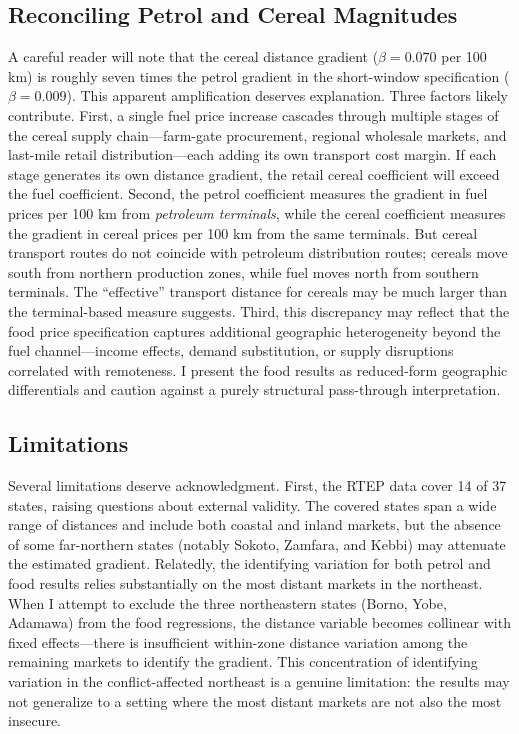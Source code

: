 \documentclass[12pt]{article}
\begin{document}
\subsection{Reconciling Petrol and Cereal Magnitudes}

A careful reader will note that the cereal distance gradient ($\beta = 0.070$ per 100 km) is roughly seven times the petrol gradient in the short-window specification ($\beta = 0.009$). This apparent amplification deserves explanation. Three factors likely contribute. First, a single fuel price increase cascades through multiple stages of the cereal supply chain---farm-gate procurement, regional wholesale markets, and last-mile retail distribution---each adding its own transport cost margin. If each stage generates its own distance gradient, the retail cereal coefficient will exceed the fuel coefficient. Second, the petrol coefficient measures the gradient in fuel prices per 100 km from \textit{petroleum terminals}, while the cereal coefficient measures the gradient in cereal prices per 100 km from the same terminals. But cereal transport routes do not coincide with petroleum distribution routes; cereals move south from northern production zones, while fuel moves north from southern terminals. The ``effective'' transport distance for cereals may be much larger than the terminal-based measure suggests. Third, this discrepancy may reflect that the food price specification captures additional geographic heterogeneity beyond the fuel channel---income effects, demand substitution, or supply disruptions correlated with remoteness. I present the food results as reduced-form geographic differentials and caution against a purely structural pass-through interpretation.

\subsection{Limitations}

Several limitations deserve acknowledgment. First, the RTEP data cover 14 of 37 states, raising questions about external validity. The covered states span a wide range of distances and include both coastal and inland markets, but the absence of some far-northern states (notably Sokoto, Zamfara, and Kebbi) may attenuate the estimated gradient. Relatedly, the identifying variation for both petrol and food results relies substantially on the most distant markets in the northeast. When I attempt to exclude the three northeastern states (Borno, Yobe, Adamawa) from the food regressions, the distance variable becomes collinear with fixed effects---there is insufficient within-zone distance variation among the remaining markets to identify the gradient. This concentration of identifying variation in the conflict-affected northeast is a genuine limitation: the results may not generalize to a setting where the most distant markets are not also the most insecure.
\end{document}
